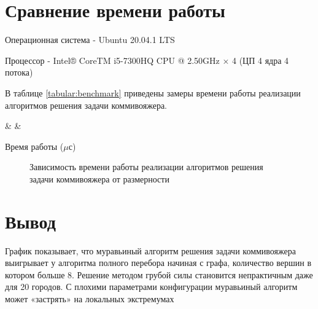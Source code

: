\pagebreak
\section{Сравнение времени работы}

Операционная система - Ubuntu 20.04.1 LTS

Процессор - Intel® CoreTM i5-7300HQ CPU @ 2.50GHz × 4 (ЦП 4 ядра 4 потока)

В таблице \ref{tabular:benchmark} приведены замеры времени работы
реализации алгоритмов решения задачи коммивояжера.


\setlength\tabcolsep{0.2cm}

\begin{table}[h]
    \centering
    { \csvcoli & \csvcolii & \csvcoliii}
    \caption{\label{tabular:benchmark} Время работы ($\mu$с)}
\end{table}


\begin{figure}[!h]
    \centering
    \caption{Зависимость времени работы реализации алгоритмов решения задачи коммивояжера от размерности}
    \label{fig:4.4}
\end{figure}

\pagebreak
\section{Вывод}

График показывает, что муравьиный алгоритм решения задачи коммивояжера выигрывает
у алгоритма полного перебора начиная с графа, количество вершин в котором больше 8.
Решение методом грубой силы становится непрактичным даже для 20 городов.
С плохими параметрами конфигурации муравьиный алгоритм может «застрять» на локальных экстремумах